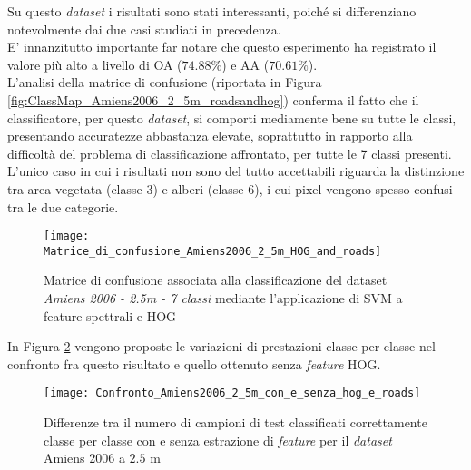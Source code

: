 Su questo \emph{dataset} i risultati sono stati interessanti, poiché
si differenziano notevolmente dai due casi studiati in precedenza.\\

E' innanzitutto importante far notare che questo esperimento ha
registrato il valore più alto a livello di OA ($74.88\%$) e AA
($70.61\%$). \\

L'analisi della matrice di confusione (riportata in Figura
\ref{fig:ClassMap_Amiens2006_2_5m_roadsandhog}) conferma il fatto che
il classificatore, per questo \emph{dataset}, si comporti mediamente
bene su tutte le classi, presentando accuratezze abbastanza elevate,
soprattutto in rapporto alla difficoltà del problema di
classificazione affrontato, per tutte le 7 classi presenti.\\L'unico
caso in cui i risultati non sono del tutto accettabili riguarda la
distinzione tra area vegetata (classe 3) e alberi (classe 6), i cui
pixel vengono spesso confusi tra le due categorie.

\begin{figure}[!ht]

\texttt{[image: Matrice\_di\_confusione\_Amiens2006\_2\_5m\_HOG\_and\_roads]}

\caption{Matrice di confusione associata alla classificazione del
dataset \emph{Amiens 2006 - 2.5m - 7 classi} mediante l'applicazione di SVM a feature spettrali e HOG}

\label{fig:Matrice_di_confusione_Amiens2006_2_5m_HOG_and_roads}

\end{figure}

In Figura \ref{fig:Confronto_Amiens2006_2_5m_con_e_senza_hog_e_roads}
vengono proposte le variazioni di prestazioni classe per classe nel
confronto fra questo risultato e quello ottenuto senza \emph{feature} HOG.\\

\begin{figure}[!ht]

\texttt{[image: Confronto\_Amiens2006\_2\_5m\_con\_e\_senza\_hog\_e\_roads]}

\caption{Differenze tra il numero di campioni di test classificati correttamente classe per classe con e
senza estrazione di \emph{feature} per il \emph{dataset} Amiens 2006 a
$2.5$ m}

\label{fig:Confronto_Amiens2006_2_5m_con_e_senza_hog_e_roads}

\end{figure}

